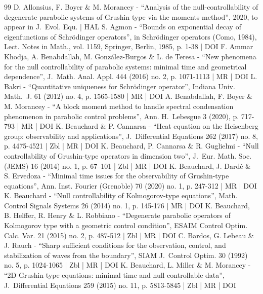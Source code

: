 \begin{thebibliography}{99}
D. Allonsius, F. Boyer \& M. Morancey - “Analysis of the null-controllability of degenerate parabolic systems of Grushin type via the moments method”, 2020, to appear in J. Evol. Equ. | HAL
S. Agmon - “Bounds on exponential decay of eigenfunctions of Schrödinger operators”, in Schrödinger operators (Como, 1984), Lect. Notes in Math., vol. 1159, Springer, Berlin, 1985, p. 1-38 | DOI
F. Ammar Khodja, A. Benabdallah, M. González-Burgos \& L. de Teresa - “New phenomena for the null controllability of parabolic systems: minimal time and geometrical dependence”, J. Math. Anal. Appl. 444 (2016) no. 2, p. 1071-1113 | MR | DOI
L. Bakri - “Quantitative uniqueness for Schrödinger operator”, Indiana Univ. Math. J. 61 (2012) no. 4, p. 1565-1580 | MR | DOI
A. Benabdallah, F. Boyer \& M. Morancey - “A block moment method to handle spectral condensation phenomenon in parabolic control problems”, Ann. H. Lebesgue 3 (2020), p. 717-793 | MR | DOI
K. Beauchard \& P. Cannarsa - “Heat equation on the Heisenberg group: observability and applications”, J. Differential Equations 262 (2017) no. 8, p. 4475-4521 | Zbl | MR | DOI
K. Beauchard, P. Cannarsa \& R. Guglielmi - “Null controllability of Grushin-type operators in dimension two”, J. Eur. Math. Soc. (JEMS) 16 (2014) no. 1, p. 67–101 | Zbl | MR | DOI
K. Beauchard, J. Dardé \& S. Ervedoza - “Minimal time issues for the observability of Grushin-type equations”, Ann. Inst. Fourier (Grenoble) 70 (2020) no. 1, p. 247-312 | MR | DOI
K. Beauchard - “Null controllability of Kolmogorov-type equations”, Math. Control Signals Systems 26 (2014) no. 1, p. 145-176 | MR | DOI
K. Beauchard, B. Helffer, R. Henry \& L. Robbiano - “Degenerate parabolic operators of Kolmogorov type with a geometric control condition”, ESAIM Control Optim. Calc. Var. 21 (2015) no. 2, p. 487-512 | Zbl | MR | DOI
C. Bardos, G. Lebeau \& J. Rauch - “Sharp sufficient conditions for the observation, control, and stabilization of waves from the boundary”, SIAM J. Control Optim. 30 (1992) no. 5, p. 1024-1065 | Zbl | MR | DOI
K. Beauchard, L. Miller \& M. Morancey - “2D Grushin-type equations: minimal time and null controllable data”, J. Differential Equations 259 (2015) no. 11, p. 5813-5845 | Zbl | MR | DOI

\end{thebibliography}
